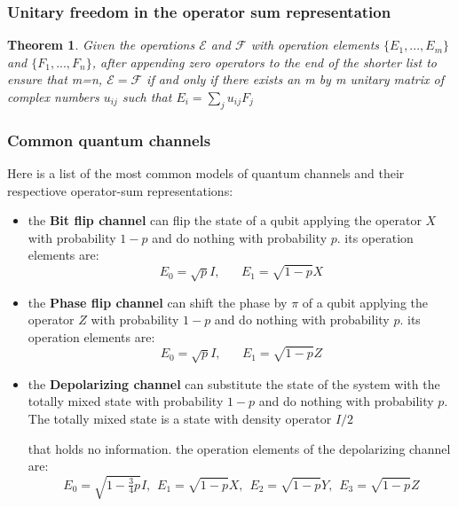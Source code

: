 \documentclass{article}
\newtheorem{theorem}{Theorem}
\begin{document}
\subsubsection{Unitary freedom in the operator sum representation}

\begin{theorem}
	\label{freedom}
	Given the operations $\mathcal{E}$ and $\mathcal{F}$ with operation elements
	$\{E_1,...,E_m\}$ and $\{F_1,...,F_n\}$, after appending zero operators
	to the end of the shorter list to ensure that m=n,
	$\mathcal{E}=\mathcal{F}$ if and only if there exists an m by m unitary matrix
	of complex numbers $u_{ij}$ such that $E_i = \sum_j u_{ij} F_j$

\end{theorem}



\subsubsection{Common quantum channels}

Here is a list of the most common models of quantum channels and their respectiove
operator-sum representations:

\begin{itemize}

	\item the \textbf{Bit flip channel} can flip the state of a qubit applying
	      the operator $X$ with probability $1-p$ and do nothing with
	      probability $p$.
	      its operation elements are:
	      \begin{equation}
		      E_0 = \sqrt{p}I, \hspace{20pt} E_1 = \sqrt{1-p}X
	      \end{equation}

	\item the \textbf{Phase flip channel} can shift the phase by $\pi$ of a qubit applying
	      the operator $Z$ with probability $1-p$ and do nothing with
	      probability $p$.
	      its operation elements are:
	      \begin{equation}
		      E_0 = \sqrt{p}I, \hspace{20pt} E_1 = \sqrt{1-p}Z
	      \end{equation}

	\item the \textbf{Depolarizing channel} can substitute the state of the system with the
	      totally mixed state with probability $1-p$ and do nothing with
	      probability $p$.
	      The totally mixed state is a state with density operator $I/2$

	      that holds no information.
	      the operation elements of the depolarizing channel are:
	      \begin{equation}
		      E_0 = \sqrt{1-\tfrac{3}{4}p}I, \hspace{5pt} E_1 = \sqrt{1-p}X , \hspace{5pt}
		      E_2 = \sqrt{1-p}Y , \hspace{5pt} E_3 = \sqrt{1-p}Z
	      \end{equation}


\end{itemize}
\end{document}

